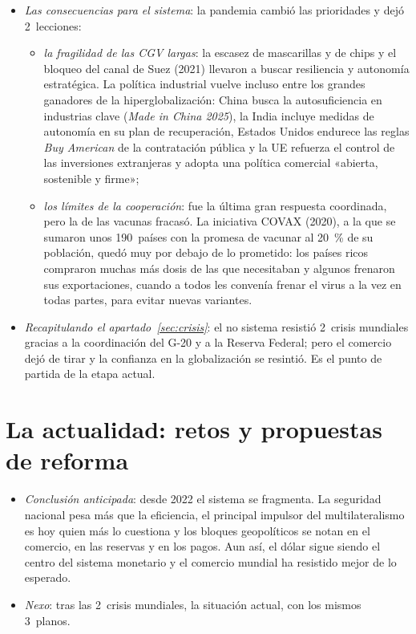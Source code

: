 \documentclass[11pt]{article}
\begin{document}
\begin{itemize}
\begin{itemize}
  \end{itemize}
\item \emph{Las consecuencias para el sistema}: la pandemia cambió las prioridades y dejó 2~lecciones:
  \begin{itemize}
  \item \emph{la fragilidad de las CGV largas}: la escasez de mascarillas y de chips y el bloqueo del canal de Suez (2021) llevaron a buscar resiliencia y autonomía estratégica. La política industrial vuelve incluso entre los grandes ganadores de la hiperglobalización: China busca la autosuficiencia en industrias clave (\emph{Made in China 2025}), la India incluye medidas de autonomía en su plan de recuperación, Estados Unidos endurece las reglas \emph{Buy American} de la contratación pública y la UE refuerza el control de las inversiones extranjeras y adopta una política comercial «abierta, sostenible y firme»;
  \item \emph{los límites de la cooperación}: fue la última gran respuesta coordinada, pero la de las vacunas fracasó. La iniciativa COVAX (2020), a la que se sumaron unos 190~países con la promesa de vacunar al 20~\% de su población, quedó muy por debajo de lo prometido: los países ricos compraron muchas más dosis de las que necesitaban y algunos frenaron sus exportaciones, cuando a todos les convenía frenar el virus a la vez en todas partes, para evitar nuevas variantes.
  \end{itemize}
\item \emph{Recapitulando el apartado~\ref{sec:crisis}}: el no sistema resistió 2~crisis mundiales gracias a la coordinación del G-20 y a la Reserva Federal; pero el comercio dejó de tirar y la confianza en la globalización se resintió. Es el punto de partida de la etapa actual.
\end{itemize}

\section{La actualidad: retos y propuestas de reforma}\label{sec:actualidad}

\begin{itemize}
\item \emph{Conclusión anticipada}: desde 2022 el sistema se fragmenta. La seguridad nacional pesa más que la eficiencia, el principal impulsor del multilateralismo es hoy quien más lo cuestiona y los bloques geopolíticos se notan en el comercio, en las reservas y en los pagos. Aun así, el dólar sigue siendo el centro del sistema monetario y el comercio mundial ha resistido mejor de lo esperado.
\item \emph{Nexo}: tras las 2~crisis mundiales, la situación actual, con los mismos 3~planos.
\end{itemize}
\end{document}
